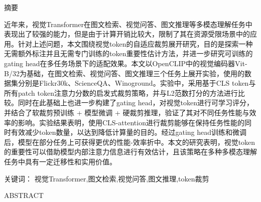 \documentclass{article}
\let\bfseries\mdseries
\begin{document}
	\thispagestyle{empty} %
	\centering          %
	\fontsize{18}{22}\heiti 摘要  %
	\par
	\vspace{1em}        %
	
	\begingroup
	\raggedright
	\fontsize{12}{20}\selectfont  %
	\setlength{\baselineskip}{20pt} %
	\setlength{\parindent}{2em}   %
	\songti  %
	近年来，视觉Transformer在图文检索、视觉问答、图文推理等多模态理解任务中表现出了较强的能力，但是由于计算开销比较大，限制了其在资源受限场景中的应用。针对上述问题，本文围绕视觉token的自适应裁剪展开研究，目的是探索一种无需额外标注并且无需专门训练的token重要性估计方法，并进一步研究可训练的gating head在多任务场景下的适配效果。本文以OpenCLIP中的视觉编码器Vit-B/32为基础，在图文检索、视觉问答、图文推理三个任务上展开实验，使用的数据集分别是Flickr30k、ScienceQA、Winoground。实验中，采用基于CLS token与所有patch token注意力分数的启发式裁剪策略，并与L2范数打分的方法进行比较。同时在此基础上也进一步构建了gating head，对视觉token进行可学习评分，并结合了软裁剪预训练 + 模型微调 + 硬裁剪推理，验证了其对不同任务性能与效率的影响。实验结果表明，使用CLS-attention进行裁剪能够在保持任务性能的同时有效减少token数量，以达到降低计算量的目的。经过gating head训练和微调后，模型在部分任务上可获得更优的性能-效率折中。本文的研究表明，视觉token的重要性可以借助模型内部注意力信息进行有效估计，且该策略在多种多模态理解任务中具有一定迁移性和实用价值。
	\par
	\endgroup
	\vspace{1em}        %
	
	\raggedright
	\noindent\fontsize{15}{18}\heiti 关键词：
	\fontsize{12}{15}\selectfont\songti 视觉Transformer,\fontsize{12}{15}\selectfont 图文检索,\fontsize{12}{15}\selectfont\songti 视觉问答,\fontsize{12}{15}\selectfont 图文推理,\fontsize{12}{15}\selectfont\songti token裁剪
	
	\newpage
	\thispagestyle{empty} %
	\centering
	\fontsize{18}{22}\bfseries ABSTRACT  %
	\par
	\vspace{1em}
	
\end{document}

